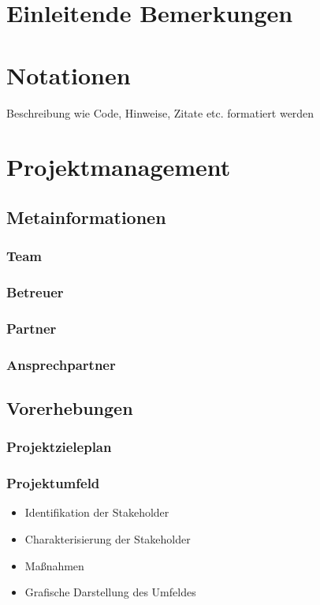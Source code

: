 \def \currentAuthor {Das Projektteam} %

\chapter*{Einleitende Bemerkungen}

\chapter*{Notationen}
Beschreibung wie Code, Hinweise, Zitate etc. formatiert werden  


\chapter{Projektmanagement}
\section{Metainformationen}
\subsection{Team}
\subsection{Betreuer}
\subsection{Partner}
\subsection{Ansprechpartner}
\section{Vorerhebungen}
\subsection{Projektzieleplan}


\newpage
\subsection{Projektumfeld}
\begin{itemize}
	\item Identifikation der Stakeholder
	\item Charakterisierung der Stakeholder
	\item Maßnahmen
	\item Grafische Darstellung des Umfeldes
\end{itemize}
